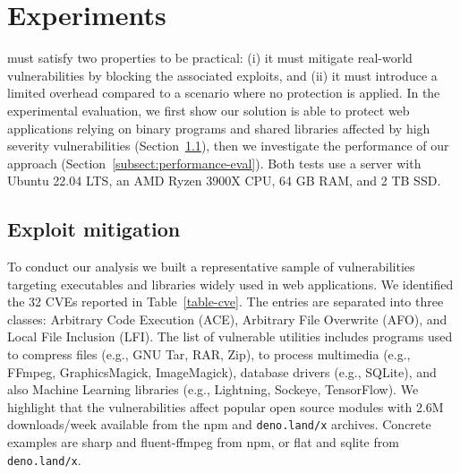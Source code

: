 \section{Experiments}
\label{natisand:sect:exp}

\natisand must satisfy two properties to be practical: (i) it must mitigate
real-world vulnerabilities by blocking the associated exploits, and
(ii) it must introduce a limited overhead compared to a scenario where
no protection is applied. In the experimental evaluation, we first
show our solution is able to protect web applications relying on
binary programs and shared libraries affected by high severity
vulnerabilities (Section~\ref{subnatisand:sect:exploit-mitigation}), then we
investigate the performance of our approach
(Section~\ref{subsect:performance-eval}).
Both tests use a server with Ubuntu 22.04 LTS, an AMD Ryzen 3900X CPU,
64 GB RAM, and 2 TB SSD.

\subsection{Exploit mitigation}
\label{subnatisand:sect:exploit-mitigation}

To conduct our analysis we built a representative sample of
vulnerabilities targeting executables and libraries widely used in web
applications. We identified the 32 CVEs reported in
Table~\ref{table-cve}. The entries are separated into three classes:
Arbitrary Code Execution (ACE), Arbitrary File Overwrite (AFO), and
Local File Inclusion (LFI). The list of vulnerable utilities includes
programs used to compress files (e.g., GNU Tar, RAR, Zip), to process
multimedia (e.g., FFmpeg, GraphicsMagick, ImageMagick), database
drivers (e.g., SQLite), and also Machine Learning libraries (e.g.,
Lightning, Sockeye, TensorFlow). We highlight that the vulnerabilities
affect popular open source modules with 2.6M downloads/week available
from the npm and {\tt deno.land/x} archives. Concrete examples are
sharp and fluent-ffmpeg from npm, or flat and sqlite from {\tt
  deno.land/x}.

